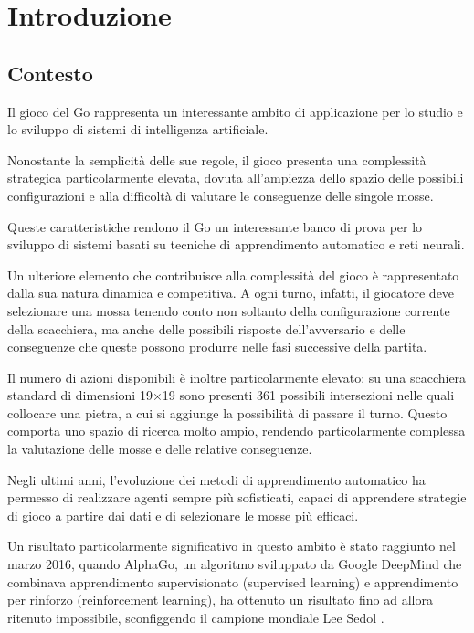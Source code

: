\section{Introduzione}

\subsection{Contesto}

Il gioco del Go rappresenta un interessante ambito di applicazione per lo studio e lo sviluppo di sistemi di intelligenza artificiale.

Nonostante la semplicità delle sue regole, il gioco presenta una complessità strategica particolarmente elevata, dovuta all'ampiezza dello spazio delle possibili configurazioni e alla difficoltà di valutare le conseguenze delle singole mosse.

Queste caratteristiche rendono il Go un interessante banco di prova per lo sviluppo di sistemi basati su tecniche di apprendimento automatico e reti neurali.

Un ulteriore elemento che contribuisce alla complessità del gioco è rappresentato dalla sua natura dinamica e competitiva. A ogni turno, infatti, il giocatore deve selezionare una mossa tenendo conto non soltanto della configurazione corrente della scacchiera, ma anche delle possibili risposte dell'avversario e delle conseguenze che queste possono produrre nelle fasi successive della partita.

Il numero di azioni disponibili è inoltre particolarmente elevato: su una scacchiera standard di dimensioni 19×19 sono presenti 361 possibili intersezioni nelle quali collocare una pietra, a cui si aggiunge la possibilità di passare il turno. Questo comporta uno spazio di ricerca molto ampio, rendendo particolarmente complessa la valutazione delle mosse e delle relative conseguenze.

Negli ultimi anni, l'evoluzione dei metodi di apprendimento automatico ha permesso di realizzare agenti sempre più sofisticati, capaci di apprendere strategie di gioco a partire dai dati e di selezionare le mosse più efficaci.

Un risultato particolarmente significativo in questo ambito è stato raggiunto nel marzo 2016, quando AlphaGo, un algoritmo sviluppato da Google DeepMind che combinava apprendimento supervisionato (supervised learning) e apprendimento per rinforzo (reinforcement learning), ha ottenuto un risultato fino ad allora ritenuto impossibile, sconfiggendo il campione mondiale Lee Sedol \cite{alphago}.


